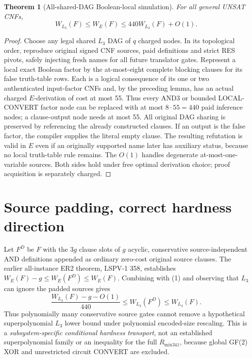 \documentclass[11pt]{article}
\newtheorem{theorem}{Theorem}
\begin{document}
\begin{theorem}[All-shared-DAG Boolean-local simulation]
For all general UNSAT CNFs,
\[
\boxed{W_{L_3}(F)\le W_E(F)\le440W_{L_3}(F)+O(1).}\tag{1}
\]
\end{theorem}
\begin{proof}
Choose any legal shared \(L_3\) DAG of \(q\) charged nodes. In its topological order, reproduce original signed CNF sources, paid definitions and strict RES pivots, safely injecting fresh names for all future translator gates. Represent a local exact Boolean factor by the at-most-eight complete blocking clauses for its false truth-table rows. Each is a logical consequence of its one or two authenticated input-factor CNFs and, by the preceding lemma, has an actual charged \(E\)-derivation of cost at most 55. Thus every AND3 or bounded LOCAL-CONVERT factor node can be replaced with at most \(8\cdot55=440\) paid inference nodes; a clause-output node needs at most 55. All original DAG sharing is preserved by referencing the already constructed clauses. If an output is the false factor, the compiler supplies the literal empty clause. The resulting refutation is valid in \(E\) even if an originally supported name later has auxiliary status, because no local truth-table rule remains. The \(O(1)\) handles degenerate at-most-one-variable sources. Both sides hold under free optimal derivation choice; proof acquisition is separately charged.
\end{proof}

\section*{Source padding, correct hardness direction}
Let \(F^D\) be \(F\) with the \(3g\) clause slots of \(g\) acyclic, conservative source-independent AND definitions appended as ordinary zero-cost original source clauses. The earlier all-instance ER2 theorem, LSPV-1 358, establishes \(W_E(F)-g\le W_E(F^D)\le W_E(F)\). Combining with (1) and observing that \(L_3\) can ignore the padded sources gives
\[
\boxed{\frac{W_{L_3}(F)-g-O(1)}{440}\le W_{L_3}(F^D)\le W_{L_3}(F).}\tag{2}
\]
Thus polynomially many conservative source gates cannot remove a hypothetical superpolynomial \(L_3\) lower bound under polynomial encoded-size rescaling. This is a \emph{subsystem-specific conditional hardness transport}, not an established superpolynomial family or an inequality for the full \(R_{\mathrm{mix341}}\), because global GF(2) XOR and unrestricted circuit CONVERT are excluded.
\end{document}
